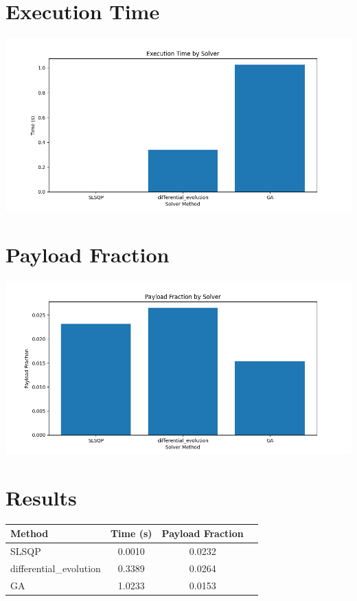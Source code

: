 \documentclass{article}
\begin{document}
\section{Execution Time}
\includegraphics[width=\textwidth]{execution_time.png}

\section{Payload Fraction}
\includegraphics[width=\textwidth]{payload_fraction.png}

\section{Results}
\begin{tabular}{lccc}
\hline
Method & Time (s) & Payload Fraction \\
\hline
SLSQP & 0.0010 & 0.0232 \\
differential_evolution & 0.3389 & 0.0264 \\
GA & 1.0233 & 0.0153 \\

\hline
\end{tabular}
\end{document}
